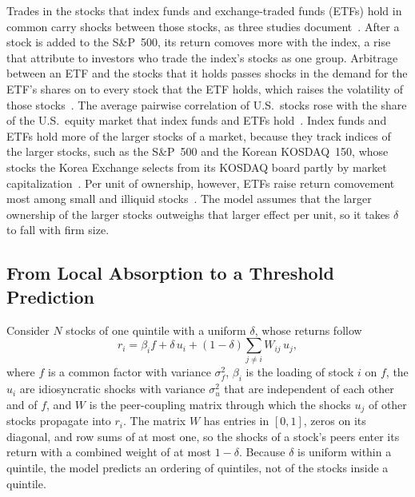 \documentclass[a4paper,fleqn]{cas-sc}
\begin{document}
Trades in the stocks that index funds and exchange-traded funds (ETFs) hold in common carry shocks between those stocks, as three studies document~\citep{sullivan2012index, barberis2005comovement, bendavid2018etfs}. After a stock is added to the S\&P~500, its return comoves more with the index, a rise that \citet{barberis2005comovement} attribute to investors who trade the index's stocks as one group. Arbitrage between an ETF and the stocks that it holds passes shocks in the demand for the ETF's shares on to every stock that the ETF holds, which raises the volatility of those stocks~\citep{bendavid2018etfs}. The average pairwise correlation of U.S.\ stocks rose with the share of the U.S.\ equity market that index funds and ETFs hold~\citep{sullivan2012index}. Index funds and ETFs hold more of the larger stocks of a market, because they track indices of the larger stocks, such as the S\&P~500 and the Korean KOSDAQ~150, whose stocks the Korea Exchange selects from its KOSDAQ board partly by market capitalization~\citep{krx2015kosdaq150}. Per unit of ownership, however, ETFs raise return comovement most among small and illiquid stocks~\citep{da2018etf}. The model assumes that the larger ownership of the larger stocks outweighs that larger effect per unit, so it takes $\delta$ to fall with firm size.

\subsection{From Local Absorption to a Threshold Prediction}\label{subsec:toy_model}

Consider $N$ stocks of one quintile with a uniform $\delta$, whose returns follow
\begin{equation}\label{eq:toy_rgp}
  r_i = \beta_i f + \delta\, u_i + (1 - \delta)\sum_{j \neq i} W_{ij}\, u_j,
\end{equation}
where $f$ is a common factor with variance $\sigma_f^2$, $\beta_i$ is the loading of stock $i$ on $f$, the $u_i$ are idiosyncratic shocks with variance $\sigma_u^2$ that are independent of each other and of $f$, and $W$ is the peer-coupling matrix through which the shocks $u_j$ of other stocks propagate into $r_i$. The matrix $W$ has entries in $[0,1]$, zeros on its diagonal, and row sums of at most one, so the shocks of a stock's peers enter its return with a combined weight of at most $1-\delta$. Because $\delta$ is uniform within a quintile, the model predicts an ordering of quintiles, not of the stocks inside a quintile.
\end{document}
